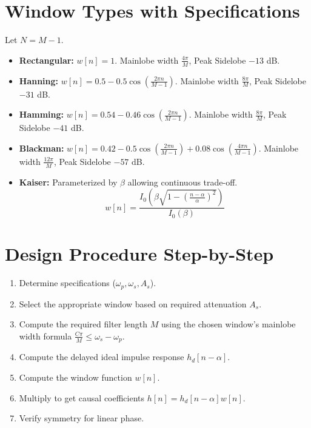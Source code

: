 \documentclass[11pt,a4paper]{article}
\begin{document}
\section{Window Types with Specifications}
Let $N = M - 1$.
\begin{itemize}
    \item \textbf{Rectangular:} $w[n] = 1$. Mainlobe width $\frac{4\pi}{M}$, Peak Sidelobe $-13$ dB.
    \item \textbf{Hanning:} $w[n] = 0.5 - 0.5 \cos\left(\frac{2\pi n}{M-1}\right)$. Mainlobe width $\frac{8\pi}{M}$, Peak Sidelobe $-31$ dB.
    \item \textbf{Hamming:} $w[n] = 0.54 - 0.46 \cos\left(\frac{2\pi n}{M-1}\right)$. Mainlobe width $\frac{8\pi}{M}$, Peak Sidelobe $-41$ dB.
    \item \textbf{Blackman:} $w[n] = 0.42 - 0.5 \cos\left(\frac{2\pi n}{M-1}\right) + 0.08 \cos\left(\frac{4\pi n}{M-1}\right)$. Mainlobe width $\frac{12\pi}{M}$, Peak Sidelobe $-57$ dB.
    \item \textbf{Kaiser:} Parameterized by $\beta$ allowing continuous trade-off.
    \begin{equation}
    w[n] = \frac{I_0\left(\beta \sqrt{1 - \left(\frac{n - \alpha}{\alpha}\right)^2}\right)}{I_0(\beta)}
    \end{equation}
\end{itemize}

\section{Design Procedure Step-by-Step}
\begin{enumerate}
    \item Determine specifications ($\omega_p, \omega_s, A_s$).
    \item Select the appropriate window based on required attenuation $A_s$.
    \item Compute the required filter length $M$ using the chosen window's mainlobe width formula $\frac{C\pi}{M} \le \omega_s - \omega_p$.
    \item Compute the delayed ideal impulse response $h_d[n-\alpha]$.
    \item Compute the window function $w[n]$.
    \item Multiply to get causal coefficients $h[n] = h_d[n-\alpha] w[n]$.
    \item Verify symmetry for linear phase.
\end{enumerate}
\end{document}
